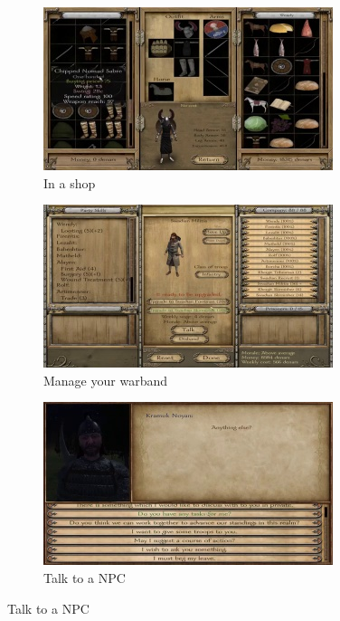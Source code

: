 \documentclass[
]{article}
\begin{document}
\begin{figure}[H]
	\centering
	\begin{subfigure}[b]{0.3\textwidth}
		\includegraphics[width=\linewidth]{docimages/E_0056_00_31_30.jpg}
		\caption{In a shop}
	\end{subfigure}
	\begin{subfigure}[b]{0.3\textwidth}
		\includegraphics[width=\linewidth]{docimages/E_0056_00_58_08.jpg}
		\caption{Manage your warband}
	\end{subfigure}
	\begin{subfigure}[b]{0.3\textwidth}
		\includegraphics[width=\linewidth]{docimages/E_0059_00_26_26.jpg}
		\caption{Talk to a NPC}
	\end{subfigure}
\end{figure}
\end{document}
